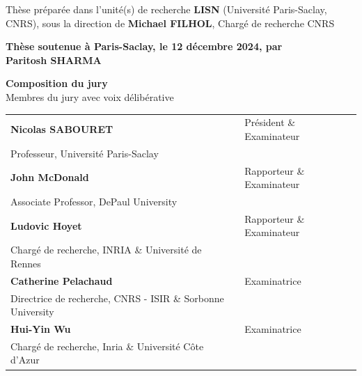 \documentclass[english,12pt,a4paper]{book}
\begin{document}
\begin{titlepage}
\footnotesize Thèse préparée dans l'unité(s) de recherche \textbf{LISN} (Université Paris-Saclay, CNRS), sous la direction de \textbf{Michael FILHOL}, Chargé de recherche CNRS \\
\vspace{15mm}

\textbf{Thèse soutenue à Paris-Saclay, le 12 décembre 2024, par}\\
\bigskip
\Large {\color{Prune} \textbf{Paritosh SHARMA}} %

\vspace{\fill} %

\bigskip

\flushleft
\small {\color{Prune} \textbf{Composition du jury}}\\
{\color{Prune} \scriptsize {Membres du jury avec voix délibérative}} \\
\vspace{2mm}
\scriptsize
\begin{tabular}{|p{7cm}l}
\arrayrulecolor{Prune}
\textbf{Nicolas SABOURET} & Président \& Examinateur\\ 
Professeur, Université Paris-Saclay \\
\textbf{John McDonald} &  Rapporteur \& Examinateur \\ 
Associate Professor, DePaul University \\ 
\textbf{Ludovic Hoyet} &  Rapporteur \& Examinateur \\ 
Chargé de recherche, INRIA \& Université de Rennes \\ 
\textbf{Catherine Pelachaud} &  Examinatrice \\ 
Directrice de recherche, CNRS - ISIR \& Sorbonne University \\ 
\textbf{Hui-Yin Wu} &  Examinatrice \\ 
Chargé de recherche, Inria \& Université Côte d'Azur \\ 
 

\end{tabular} 

\end{titlepage}


\thispagestyle{empty}
\selectfont
\end{document}
